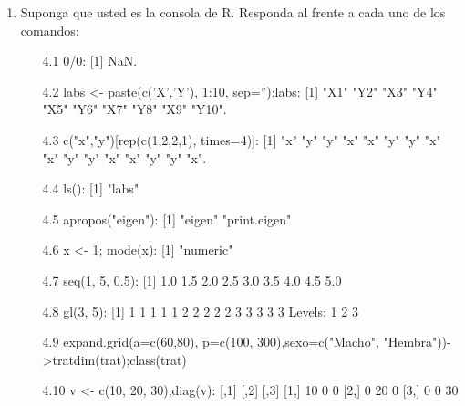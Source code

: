 \documentclass[letterpaper, 12pt]{article}
\begin{document}
\begin{enumerate}
\item Suponga que usted es la consola de R. Responda al frente a cada uno
de los comandos:
\begin{enumerate}
\item[4.1] 0/0:
[1] NaN.
\item[4.2] labs <- paste(c('X','Y'), 1:10, sep='');labs:
[1] "X1"  "Y2"  "X3"  "Y4"  "X5"  "Y6"  "X7"  "Y8"  "X9"  "Y10".
\item[4.3] c("x","y")[rep(c(1,2,2,1), times=4)]:
[1] "x" "y" "y" "x" "x" "y" "y" "x" "x" "y" "y" "x" "x" "y" "y" "x".
\item[4.4] ls():
[1] "labs"
\item[4.5] apropos("eigen"):
[1] "eigen"       "print.eigen"
\item[4.6] x <- 1; mode(x):
[1] "numeric"
\item[4.7] seq(1, 5, 0.5):
[1] 1.0 1.5 2.0 2.5 3.0 3.5 4.0 4.5 5.0
\item[4.8] gl(3, 5):
[1] 1 1 1 1 1 2 2 2 2 2 3 3 3 3 3
Levels: 1 2 3
\item[4.9] expand.grid(a=c(60,80), p=c(100, 300),sexo=c("Macho", "Hembra"))->tratdim(trat);class(trat)
\item[4.10] v <- c(10, 20, 30);diag(v):
[,1] [,2] [,3]
[1,]   10    0    0
[2,]    0   20    0
[3,]    0    0   30
\end{enumerate}

\end{enumerate}
\end{document}
